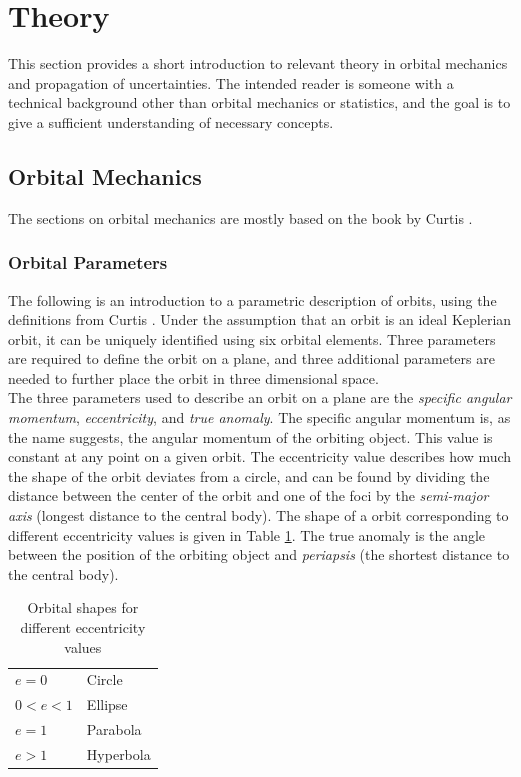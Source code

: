 
\section{Theory}

This section provides a short introduction to relevant theory in orbital mechanics and propagation of uncertainties. The intended reader is someone with a technical background other than orbital mechanics or statistics, and the goal is to give a sufficient understanding of necessary concepts. 


\subsection{Orbital Mechanics}

The sections on orbital mechanics are mostly based on the book by Curtis \cite{Curtis2009}.

\subsubsection{Orbital Parameters}

The following is an introduction to a parametric description of orbits, using the definitions from Curtis \cite{Curtis2009}. Under the assumption that an orbit is an ideal Keplerian orbit, it can be uniquely identified using six orbital elements. Three parameters are required to define the orbit on a plane, and three additional parameters are needed to further place the orbit in three dimensional space. \\

The three parameters used to describe an orbit on a plane are the \textit{specific angular momentum}, \textit{eccentricity}, and \textit{true anomaly}. The specific angular momentum is, as the name suggests, the angular momentum of the orbiting object. This value is constant at any point on a given orbit. The eccentricity value describes how much the shape of the orbit deviates from a circle, and can be found by dividing the distance between the center of the orbit and one of the foci by the \textit{semi-major axis} (longest distance to the central body). The shape of a orbit corresponding to different eccentricity values is given in Table \ref{table:eccentricity}. The true anomaly is the angle between the position of the orbiting object and \textit{periapsis} (the shortest distance to the central body). \\

\begin{table}[h]
\centering
\begin{tabular}{@{}ll@{}}
\toprule
$e = 0$      & Circle    \\
$0 < e < 1 $ & Ellipse   \\
$e = 1$      & Parabola  \\
$e > 1 $     & Hyperbola \\
\bottomrule
\end{tabular}
\caption{Orbital shapes for different eccentricity values}
\label{table:eccentricity}
\end{table}



